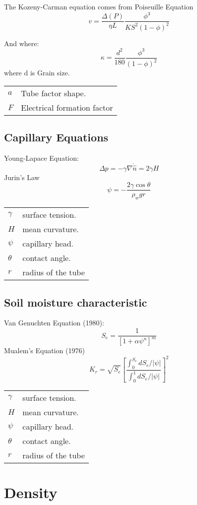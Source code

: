 \documentclass[twocolumn]{article}
\begin{document}
The Kozeny-Carman equation comes from Poiseuille Equation
$$v=\frac{\Delta(P)}{\eta L}\frac{\phi^{3}}{KS^{2}(1-\phi)^{2}}$$

And where:
$$\kappa = \frac{d^2}{180} \frac{\phi^3}{(1-\phi)^2}$$
 where d is Grain size.

\begin{tabular}{@{}ll@{}}
$a$  & Tube factor shape. \\
$F$ & Electrical formation factor\\
\end{tabular}

\subsection{Capillary Equations}
Young-Lapace Equation:
\[ \Delta p = -\gamma \nabla \dot \hat{n}=2\gamma H\]
Jurin's Law
\[ \psi=-\frac{2\gamma \cos \theta}{\rho_w g r}\]
\begin{tabular}{@{}ll@{}}
$\gamma$  & surface tension. \\
$H$ & mean curvature.\\
$\psi$ & capillary head.\\
$\theta$ & contact angle.\\
$r$ & radius of the tube
\end{tabular}

\subsection{Soil moisture characteristic}
Van Genuchten Equation (1980):
\[ S_e = \frac{1}{\left[ 1 + \alpha \psi^n \right]^m}\]
Mualem's Equation (1976)
\[ K_r= \sqrt{S_e} \left[ \frac{\int_0^{S_e}{dS_e / |\psi|}}{\int_0^1{dS_e/|\psi|}} \right] ^2 \]
\begin{tabular}{@{}ll@{}}
$\gamma$  & surface tension. \\
$H$ & mean curvature.\\
$\psi$ & capillary head.\\
$\theta$ & contact angle.\\
$r$ & radius of the tube
\end{tabular}








\section{Density}
\end{document}
